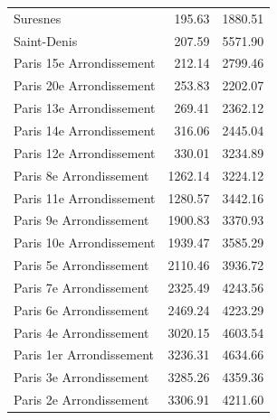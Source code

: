 \documentclass[12pt]{article}
\theoremstyle{plain}
\theoremstyle{remark}
\begin{document}
\begin{longtable}{lrr}
Suresnes                & 195.63 & 1880.51 \\
Saint-Denis             & 207.59 & 5571.90 \\
Paris 15e Arrondissement & 212.14 & 2799.46 \\
Paris 20e Arrondissement & 253.83 & 2202.07 \\
Paris 13e Arrondissement & 269.41 & 2362.12 \\
Paris 14e Arrondissement & 316.06 & 2445.04 \\
Paris 12e Arrondissement & 330.01 & 3234.89 \\
\midrule
Paris 8e Arrondissement  & 1262.14 & 3224.12 \\
Paris 11e Arrondissement & 1280.57 & 3442.16 \\
Paris 9e Arrondissement  & 1900.83 & 3370.93 \\
Paris 10e Arrondissement & 1939.47 & 3585.29 \\
Paris 5e Arrondissement  & 2110.46 & 3936.72 \\
\midrule
Paris 7e Arrondissement  & 2325.49 & 4243.56 \\
Paris 6e Arrondissement  & 2469.24 & 4223.29 \\
Paris 4e Arrondissement  & 3020.15 & 4603.54 \\
Paris 1er Arrondissement & 3236.31 & 4634.66 \\
Paris 3e Arrondissement  & 3285.26 & 4359.36 \\
Paris 2e Arrondissement  & 3306.91 & 4211.60 \\
\end{longtable}
\end{document}
